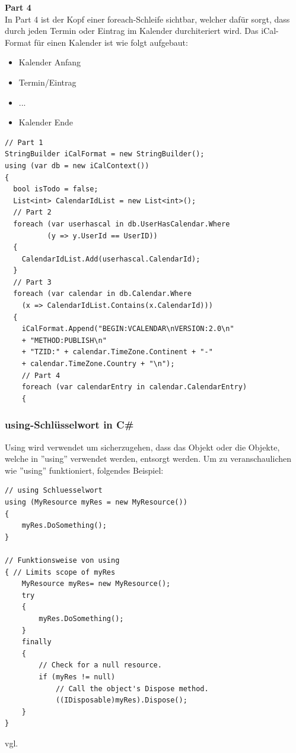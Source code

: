 \textbf{Part 4} \\
In Part 4 ist der Kopf einer foreach-Schleife sichtbar, welcher dafür sorgt, dass durch jeden Termin oder Eintrag im Kalender durchiteriert wird. Das iCal-Format für einen Kalender ist wie folgt aufgebaut: 
\begin{itemize}
\item Kalender Anfang
\item Termin/Eintrag
\item ...
\item Kalender Ende
\end{itemize}

\begin{lstlisting}[caption=Parser Verbindung zur DB mit dem Entity Framework, label=lst:test]
// Part 1
StringBuilder iCalFormat = new StringBuilder();
using (var db = new iCalContext())
{
  bool isTodo = false;
  List<int> CalendarIdList = new List<int>();
  // Part 2
  foreach (var userhascal in db.UserHasCalendar.Where
  		  (y => y.UserId == UserID))
  {
	CalendarIdList.Add(userhascal.CalendarId);
  }
  // Part 3
  foreach (var calendar in db.Calendar.Where
  	(x => CalendarIdList.Contains(x.CalendarId)))
  {
    iCalFormat.Append("BEGIN:VCALENDAR\nVERSION:2.0\n"
	+ "METHOD:PUBLISH\n"
	+ "TZID:" + calendar.TimeZone.Continent + "-" 
	+ calendar.TimeZone.Country + "\n");
    // Part 4
    foreach (var calendarEntry in calendar.CalendarEntry)
    {
\end{lstlisting} 
\subsubsection{using-Schlüsselwort in C\#}
\label{usingkeyword}
Using wird verwendet um sicherzugehen, dass das Objekt oder die Objekte, welche in ''using'' verwendet werden, entsorgt werden. Um zu veranschaulichen wie ''using'' funktioniert, folgendes Beispiel:

\begin{lstlisting}[caption=Parser funktionsweise von using, label=lst:test]
// using Schluesselwort
using (MyResource myRes = new MyResource())
{
    myRes.DoSomething();
}
 
// Funktionsweise von using 
{ // Limits scope of myRes
    MyResource myRes= new MyResource();
    try
    {
        myRes.DoSomething();
    }
    finally
    {
        // Check for a null resource.
        if (myRes != null)
            // Call the object's Dispose method.
            ((IDisposable)myRes).Dispose();
    }
}
\end{lstlisting} 
vgl. \cite{ParserUsingKeyword}
